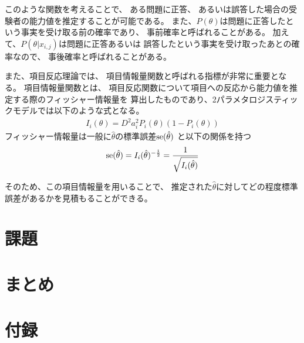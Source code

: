 \documentclass[12pt]{jarticle}
\begin{document}
このような関数を考えることで、
ある問題に正答、
あるいは誤答した場合の受験者の能力値を推定することが可能である。
また、$P(\theta)$は問題に正答したという事実を受け取る前の確率であり、
事前確率と呼ばれることがある。
加えて、$P(\theta|x_{i,j})$は問題に正答あるいは
誤答したという事実を受け取ったあとの確率なので、
事後確率と呼ばれることがある。

また、項目反応理論では、
項目情報量関数と呼ばれる指標が非常に重要となる。
項目情報量関数とは、
項目反応関数について項目への反応から能力値を推定する際のフィッシャー情報量を
算出したものであり、2パラメタロジスティックモデルでは以下のような式となる。
\begin{eqnarray}
    I_i(\theta)=D^2a_i^2 P_i(\theta)(1-P_i(\theta))
\end{eqnarray}
フィッシャー情報量は一般に$\hat{\theta}$の標準誤差${\rm se}(\hat{\theta})$
と以下の関係を持つ
\begin{eqnarray}
    {\rm se}(\hat{\theta})=I_i(\hat{\theta})^{-\frac{1}{2}}=\frac{1}{\sqrt{I_i(\hat{\theta})}}
\end{eqnarray}

そのため、この項目情報量を用いることで、
推定された$\hat{\theta}$に対してどの程度標準誤差があるかを見積もることができる。

\section{課題}
\section{まとめ}

\begin{thebibliography}{99}
    \label{sannkoubunnkenn_chapter}
\end{thebibliography}

\clearpage
\appendix
\section{付録}
\end{document}
